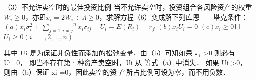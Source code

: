 
（3）不允许卖空时的最佳投资比例
当不允许卖空时，投资组合各风险资产的权重$W_{i}\geqslant0$，亦即$x_{i}=2W_{i}{\div}\Lambda\geqslant0$，求解方程（6）变成解下列库恩——塔克条件：
$(a) x_{i}{\sigma_{i}^{2}}+{{\sum_{j=1;i\neq j}}^{n}}x_{i}{\sigma_{ij}}-U_{i}=E(R_{i})-r_{f}$
$(b)x_{i}U_{i}=0$
$(c)x_{i}\geqslant0$且$U_{i}\geqslant0$$(i=1,2,\dots,n)$

其中 Ui 是为保证非负性而添加的松弛变量．由（b）可知如果 $x_{i}$
>0 则必有 Ui=0， 即当不存在第 i 种资产卖空时，Ui 从
等式（a）中消失． 如果 Ui
>0，则由（b）保证 xi
=0，因此卖空的资
产所占比例可设为零，而不用负数．




